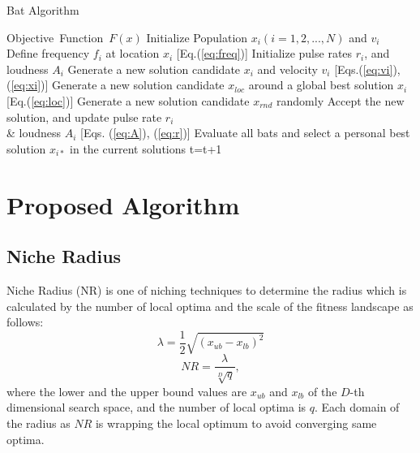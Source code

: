 \documentclass[conference]{IEEEtran}
\begin{document}
\begin{algorithm}[H]
\caption{Bat Algorithm}
\label{code:ba}
\begin{algorithmic}[1]
\REQUIRE Objective\ Function\ $F(x)$
\STATE Initialize Population $x_i(i=1,2,..., N)$ and $v_i$\\
\STATE Define frequency $f_i$ at location $x_i$ [Eq.(\ref{eq:freq})]
\STATE Initialize pulse rates $r_i$, and loudness $A_i$
\STATE Generate a new solution candidate $x_i$ and velocity $v_i$ [Eqs.(\ref{eq:vi}), (\ref{eq:xi})]
\STATE Generate a new solution candidate $x_{loc}$ around a global best solution $x_i$ [Eq.(\ref{eq:loc})] 
\ENDIF
\STATE Generate a new solution candidate $x_{rnd}$ randomly
\STATE Accept the new solution, and update pulse rate $r_i$ \\ \& loudness $A_i$ [Eqs. (\ref{eq:A}), (\ref{eq:r})]  
\ENDIF
\STATE Evaluate all bats and select a personal best solution $x_{i*}$ in the current solutions
\ENDFOR
\STATE t=t+1
\ENDWHILE
\end{algorithmic}
\end{algorithm}

\section{Proposed Algorithm}
\subsection{Niche Radius}
Niche Radius (NR) \cite{Niche}\cite{DNCMA} is one of niching techniques to determine the radius which is calculated by the number of local optima and the scale of the fitness landscape as follows:
\begin{equation}
\label{eq:lambda}
\lambda =\frac{1}{2} \sqrt{(x_{ub}-x_{lb})^2}
\end{equation}
\begin{equation}
\label{eq:NR}
NR=\frac{\lambda}{\sqrt[D]{q}},
\end{equation}
where the lower and the upper bound values are $x_{ub}$ and $x_{lb}$ of the $D$-th dimensional search space,   and the number of local optima is $q$. Each domain of the radius as $NR$ is wrapping the local optimum to avoid converging same optima.
\end{document}
